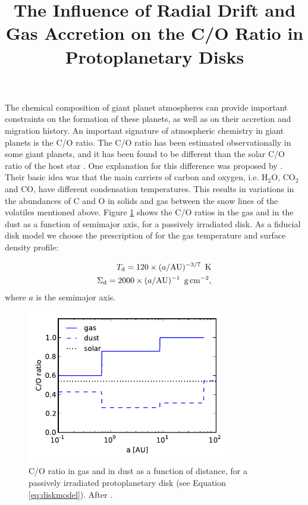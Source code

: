 \documentclass[12pt, preprint]{aastex}
\begin{document}


\title{The Influence of Radial Drift and Gas Accretion on the C/O Ratio in Protoplanetary Disks}

The chemical composition of giant planet atmospheres can provide important constraints on the formation of these planets, as well as on their accretion and migration history. An important signature of atmospheric chemistry in giant planets is the C/O ratio. The C/O ratio has been estimated observationally in some giant planets, and it has been found to be different than the solar C/O ratio of the host star \citep{madhu11}. One explanation for this difference was proposed by \citet{oberg11}. Their basic idea was that the main carriers of carbon and oxygen, i.e. H$_2$O, CO$_2$ and CO, have different condensation temperatures. This results in variations in the abundances of C and O in solids and gas between the snow lines of the volatiles mentioned above. Figure \ref{fig:CtoO} shows the C/O ratios in the gas and in the dust as a function of semimajor axis, for a passively irradiated disk. As a fiducial disk model we choose the prescription of \citet{chiang10} for the gas temperature and surface density profile:

\begin{eqnarray}
\label{eq:diskmodel}
T_{\rm d} = 120 \times (a/\rm AU)^{-3/7} \,\,\, \rm K \\
\Sigma_{\rm d} = 2000 \times (a/\rm AU)^{-1} \,\,\, \rm{g \, cm}^{-2},
\end{eqnarray}
where $a$ is the semimajor axis.


\begin{figure}[htb]
\centering
\includegraphics[width=0.8\textwidth]{figs/C_O_ratio_2.pdf}
\caption{C/O ratio in gas and in dust as a function of distance, for a passively irradiated protoplanetary disk (see Equation \ref{eq:diskmodel}). After \citet{oberg11}.} %
\label{fig:CtoO}
\end{figure}
\end{document}
